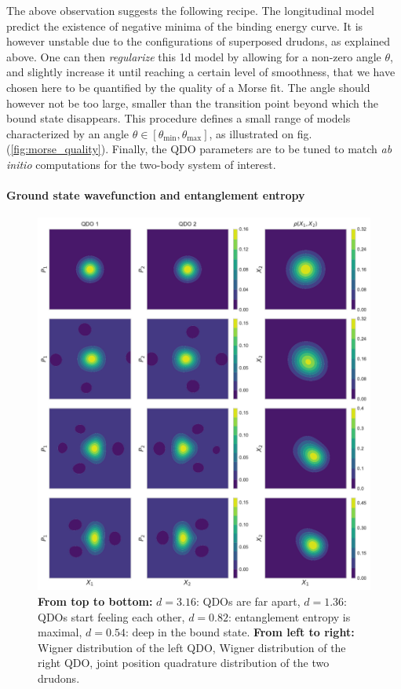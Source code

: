 \documentclass[reprint, amsmath, amssymb, floatfix, aps, pra]{revtex4-2}
\begin{document}
    The above observation suggests the following recipe. The longitudinal model predict the existence of negative minima of the binding energy curve. It is however unstable due to the configurations of superposed drudons, as explained above. One can then \textit{regularize} this 1d model by allowing for a non-zero angle $\theta$, and slightly increase it until reaching a certain level of smoothness, that we have chosen here to be quantified by the quality of a Morse fit. The angle should however not be too large, smaller than the transition point beyond which the bound state disappears. This procedure defines a small range of models characterized by an angle $\theta\in[\theta_\text{min}, \theta_\text{max}]$, as illustrated on fig. (\ref{fig:morse_quality}). Finally, the QDO parameters are to be tuned to match \textit{ab initio} computations for the two-body system of interest.
    \newline
\paragraph*{Ground state wavefunction and entanglement entropy}

    \begin{figure}
        \includegraphics[scale=0.75]{figures/wigners_joint.pdf}
        \caption{\label{fig:wigners_joint}\textbf{From top to bottom:} $d=3.16$: QDOs are far apart, $d=1.36$: QDOs start feeling each other, $d=0.82$: entanglement entropy is maximal, $d=0.54$: deep in the bound state. \textbf{From left to right:} Wigner distribution of the left QDO, Wigner distribution of the right QDO, joint position quadrature distribution of the two drudons.}
    \end{figure}
\end{document}
